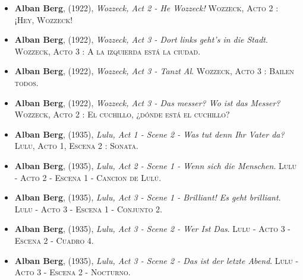 \documentclass[paper=a4, fontsize=11pt, spanish]{scrartcl}
\numberwithin{equation}{section} %
\numberwithin{figure}{section} %
\numberwithin{table}{section} %
\begin{document}
\begin{itemize}
\item \textbf{Alban Berg}, (1922), \textit{Wozzeck, Act 2 - He Wozzeck!} \textsc{ Wozzeck, Acto 2 : ¡Hey, Wozzeck!} %
\item \textbf{Alban Berg}, (1922), \textit{Wozzeck, Act 3 - Dort links geht's in die Stadt}. \textsc{ Wozzeck, Acto 3 : A la izquierda está la ciudad}. %
\item \textbf{Alban Berg}, (1922), \textit{Wozzeck, Act 3 - Tanzt Al}. \textsc{ Wozzeck, Acto 3 : Bailen todos}. %
\item \textbf{Alban Berg}, (1922), \textit{Wozzeck, Act 3 - Das messer? Wo ist das Messer?} \textsc{ Wozzeck, Acto 2 : El cuchillo, ¿dónde está el cuchillo?} %
\item \textbf{Alban Berg}, (1935), \textit{Lulu, Act 1 - Scene 2 - Was tut denn Ihr Vater da?}\textsc{ Lulu, Acto 1, Escena 2 : Sonata}. %
\item \textbf{Alban Berg}, (1935), \textit{Lulu, Act 2 - Scene 1 - Wenn sich die Menschen}.\textsc{ Lulu - Acto 2 - Escena 1 - Cancion de Lulú}. %
\item \textbf{Alban Berg}, (1935), \textit{Lulu, Act 3 - Scene 1 - Brilliant! Es geht brilliant}.\textsc{ Lulu - Acto 3 - Escena 1 - Conjunto 2}. %
\item \textbf{Alban Berg}, (1935), \textit{Lulu, Act 3 - Scene 2 - Wer Ist Das}.\textsc{ Lulu - Acto 3 - Escena 2 - Cuadro 4}. %
\item \textbf{Alban Berg}, (1935), \textit{Lulu, Act 3 - Scene 2 - Das ist der letzte Abend}.\textsc{ Lulu - Acto 3 - Escena 2 - Nocturno}. %






\end{itemize}
\end{document}
